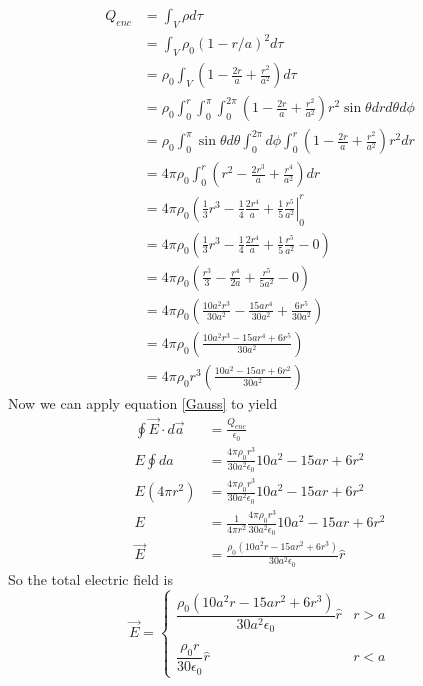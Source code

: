 \documentclass[11pt]{article}
\numberwithin{equation}{section}
\newcommand{\vecE}{\vec{E}}
\begin{document}
\begin{align*}
Q_{enc} &= \int_V\rho d\tau\\
&= \int_V\rho_0(1-r/a)^2 d\tau\\
&= \rho_0\int_V\left(1-\frac{2r}{a}+\frac{r^2}{a^2}\right) d\tau\\
&= \rho_0\int_0^{r}\int_0^{\pi}\int_0^{2\pi}\left(1-\frac{2r}{a}+\frac{r^2}{a^2}\right) r^2\sin\theta drd\theta d\phi\\
&= \rho_0\int_0^{\pi}\sin\theta d\theta\int_0^{2\pi}d\phi\int_0^{r}\left(1-\frac{2r}{a}+\frac{r^2}{a^2}\right) r^2dr\\
&= 4\pi\rho_0\int_0^{r}\left(r^2-\frac{2r^3}{a}+\frac{r^4}{a^2}\right)dr\\
&= 4\pi\rho_0\left(\frac{1}{3}r^3-\frac{1}{4}\frac{2r^4}{a}+\frac{1}{5}\frac{r^5}{a^2}\right|_0^r\\
&= 4\pi\rho_0\left(\frac{1}{3}r^3-\frac{1}{4}\frac{2r^4}{a}+\frac{1}{5}\frac{r^5}{a^2}-0\right)\\
&= 4\pi\rho_0\left(\frac{r^3}{3}-\frac{r^4}{2a}+\frac{r^5}{5a^2}-0\right)\\
&= 4\pi\rho_0\left(\frac{10a^2r^3}{30a^2}-\frac{15ar^4}{30a^2}+\frac{6r^5}{30a^2}\right)\\
&= 4\pi\rho_0\left(\frac{10a^2r^3-15ar^4+6r^5}{30a^2}\right)\\
&= 4\pi\rho_0r^3\left(\frac{10a^2-15ar+6r^2}{30a^2}\right)
\end{align*}
Now we can apply equation \ref{Gauss} to yield
\begin{align*}
\oint\vec{E}\cdot d\vec{a} &= \frac{Q_{enc}}{\epsilon_0}\\
E\oint da &= \frac{4\pi\rho_0r^3}{30a^2\epsilon_0}10a^2-15ar+6r^2\\
E(4\pi r^2) &=\frac{4\pi\rho_0r^3}{30a^2\epsilon_0}10a^2-15ar+6r^2\\
E &=\frac{1}{4\pi r^2}\frac{4\pi\rho_0r^3}{30a^2\epsilon_0}10a^2-15ar+6r^2\\
\vecE &= \frac{\rho_0(10a^2r-15ar^2+6r^3)}{30a^2\epsilon_0}\hat{r}
\end{align*}
So the total electric field is
$$\vecE = \left\{\begin{array}{lc}
	\dfrac{\rho_0(10a^2r-15ar^2+6r^3)}{30a^2\epsilon_0}\hat{r}	&r>a\\
\\	
	\dfrac{\rho_0r}{30\epsilon_0}\hat{r}				&r<a
		\end{array}\right.$$
\end{document}
